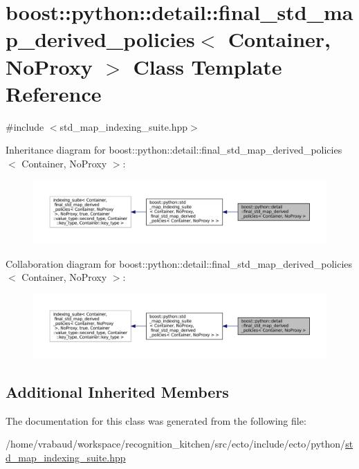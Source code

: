 \hypertarget{classboost_1_1python_1_1detail_1_1final__std__map__derived__policies}{\section{boost\-:\-:python\-:\-:detail\-:\-:final\-\_\-std\-\_\-map\-\_\-derived\-\_\-policies$<$ Container, No\-Proxy $>$ Class Template Reference}
\label{classboost_1_1python_1_1detail_1_1final__std__map__derived__policies}
}


{\ttfamily \#include $<$std\-\_\-map\-\_\-indexing\-\_\-suite.\-hpp$>$}



Inheritance diagram for boost\-:\-:python\-:\-:detail\-:\-:final\-\_\-std\-\_\-map\-\_\-derived\-\_\-policies$<$ Container, No\-Proxy $>$\-:\nopagebreak
\begin{figure}[H]
\begin{center}
\leavevmode
\includegraphics[width=350pt]{classboost_1_1python_1_1detail_1_1final__std__map__derived__policies__inherit__graph}
\end{center}
\end{figure}


Collaboration diagram for boost\-:\-:python\-:\-:detail\-:\-:final\-\_\-std\-\_\-map\-\_\-derived\-\_\-policies$<$ Container, No\-Proxy $>$\-:\nopagebreak
\begin{figure}[H]
\begin{center}
\leavevmode
\includegraphics[width=350pt]{classboost_1_1python_1_1detail_1_1final__std__map__derived__policies__coll__graph}
\end{center}
\end{figure}
\subsection*{Additional Inherited Members}


The documentation for this class was generated from the following file\-:\begin{DoxyCompactItemize}
\item 
/home/vrabaud/workspace/recognition\-\_\-kitchen/src/ecto/include/ecto/python/\hyperlink{std__map__indexing__suite_8hpp}{std\-\_\-map\-\_\-indexing\-\_\-suite.\-hpp}\end{DoxyCompactItemize}
